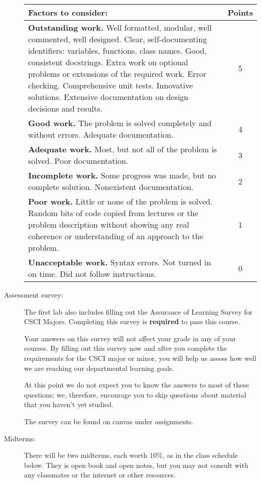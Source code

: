\documentclass[12pt]{article}
\begin{document}
\begin{description}
\begin{tabular}{p{}|c}
\bf Factors to consider: & \bf Points \\\hline
{\bf Outstanding work.}    Well formatted, modular,
well commented, well designed.  
Clear, self-documenting identifiers: variables, functions, class names.
Good, consistent docstrings.
 Extra work on optional problems or extensions
of the required work.  Error checking.  Comprehensive unit tests. Innovative solutions.
Extensive documentation on design decisions and results.
 & 5 \\\hline
{\bf Good work.}  The problem is solved completely and without errors.
Adequate documentation.
 & 4 \\\hline
{\bf Adequate work.}  Most, but not all of the problem is solved.  Poor documentation.
 & 3 \\\hline
 {\bf Incomplete work.}  Some progress was made, but no complete solution.
 Nonexistent documentation.
 & 2 \\\hline
{\bf Poor work.}  Little or none of the problem is solved.  Random bits of code copied
from lectures or the problem description without showing any real coherence
or understanding of an approach to the problem.
 & 1 \\\hline
{\bf Unacceptable work.}
 Syntax errors.  Not turned in on time.  Did not follow instructions. & 0 \\
\end{tabular}

\item[Assessment survey:]
The first lab also includes filling out the Assurance of Learning Survey for CSCI Majors.
Completing this survey is {\bf required} to pass this course.

Your answers on this survey will not affect your grade in any of your courses.
By filling out this survey now and after you complete the requirements for the CSCI
major or minor, you will help us assess how well we are reaching our departmental
learning goals.

At this point we do not expect you to know the answers to most of these questions;
we, therefore, encourage you to skip questions about material that you haven’t yet
studied.

The survey can be found on canvas under assignments.

\item[Midterms:]  There will be two midterms, each worth 10\%, as
in the class schedule below.   They is open
book and open notes, but you may not consult with any classmates
or the internet or other resources.



\end{description}
\end{document}
